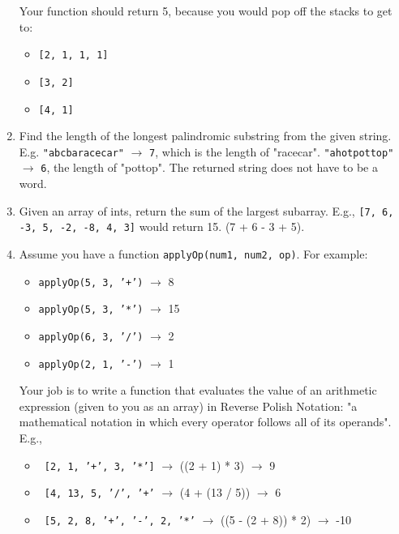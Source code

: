 \documentclass{article}
\begin{document}
\begin{enumerate}
Your function should return 5, because you would pop off the stacks to get to:

\begin{itemize}
  \item \texttt{[2, 1, 1, 1]}
  \item \texttt{[3, 2]}
  \item \texttt{[4, 1]}
\end{itemize}

\item Find the length of the longest palindromic substring from the given string. E.g. \texttt{"abcbaracecar"} $\rightarrow$ \texttt{7}, which is the length of "racecar". \texttt{"ahotpottop"} $\rightarrow$ \texttt{6}, the length of "pottop". The returned string does not have to be a word.

\item Given an array of ints, return the sum of the largest subarray. E.g., \texttt{[7, 6, -3, 5, -2, -8, 4, 3]} would return 15. (7 + 6 - 3 + 5).

\item Assume you have a function \texttt{applyOp(num1, num2, op)}. For example: %

\begin{itemize}

    \item \texttt{applyOp(5, 3, '+')} $\rightarrow$ 8
    \item \texttt{applyOp(5, 3, '*')} $\rightarrow$ 15
    \item \texttt{applyOp(6, 3, '/')} $\rightarrow$ 2
    \item \texttt{applyOp(2, 1, '-')} $\rightarrow$ 1


\end{itemize}

Your job is to write a function that evaluates the value of an arithmetic expression (given to you as an array) in Reverse Polish Notation: "a mathematical notation in which every operator follows all of its operands". E.g.,

\begin{itemize}

    \item \texttt{ [2, 1, '+', 3, '*']} $\rightarrow$ ((2 + 1) * 3) $\rightarrow$ 9
    \item \texttt{ [4, 13, 5, '/', '+'} $\rightarrow$ (4 + (13 / 5)) $\rightarrow$ 6
    \item \texttt{ [5, 2, 8, '+', '-', 2, '*'} $\rightarrow$ ((5 - (2 + 8)) * 2) $\rightarrow$ -10


\end{itemize}
\end{enumerate}
\end{document}
